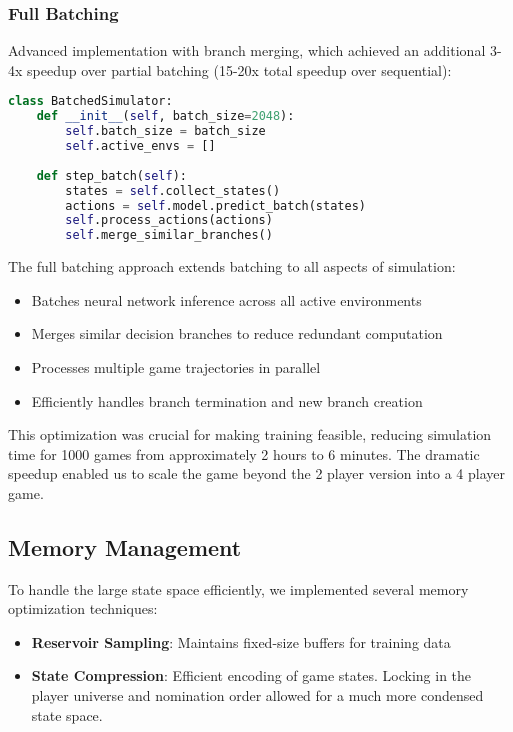 \documentclass[11pt]{article}
\begin{document}
\subsubsection{Full Batching}
Advanced implementation with branch merging, which achieved an additional 3-4x speedup over partial batching (15-20x total speedup over sequential):
\begin{lstlisting}[language=Python]
class BatchedSimulator:
    def __init__(self, batch_size=2048):
        self.batch_size = batch_size
        self.active_envs = []
        
    def step_batch(self):
        states = self.collect_states()
        actions = self.model.predict_batch(states)
        self.process_actions(actions)
        self.merge_similar_branches()
\end{lstlisting}

The full batching approach extends batching to all aspects of simulation:
\begin{itemize}
    \item Batches neural network inference across all active environments
    \item Merges similar decision branches to reduce redundant computation
    \item Processes multiple game trajectories in parallel
    \item Efficiently handles branch termination and new branch creation
\end{itemize}

This optimization was crucial for making training feasible, reducing simulation time for 1000 games from approximately 2 hours to 6 minutes. The dramatic speedup enabled us to scale the game beyond the 2 player version into a 4 player game.

\subsection{Memory Management}
To handle the large state space efficiently, we implemented several memory optimization techniques:

\begin{itemize}
    \item \textbf{Reservoir Sampling}: Maintains fixed-size buffers for training data
    \item \textbf{State Compression}: Efficient encoding of game states. Locking in the player universe and nomination order allowed for a much more condensed state space.
\end{itemize}
\end{document}
